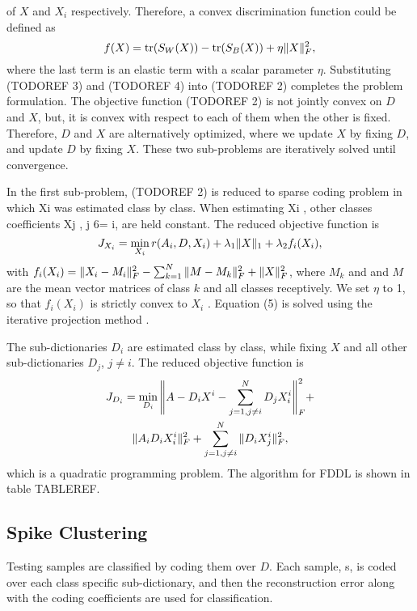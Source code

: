 \documentclass[conference]{IEEEtran}
\begin{document}
	of $X$ and $X_i$ respectively. Therefore, a convex discrimination
	function could be defined as
	\begin{equation}
		f(X)=\mathrm{tr}(S_W(X))-\mathrm{tr}(S_B(X))+\eta\Vert{X}\Vert_F^2,
	\end{equation}
	where the last term is an elastic term with a scalar parameter $\eta$. Substituting (TODOREF 3) and (TODOREF 4) into (TODOREF 2) completes the problem formulation. The objective function (TODOREF 2) is not jointly convex on $D$ and $X$, but, it is convex with respect to each of them when the other is fixed. Therefore, $D$ and $X$ are alternatively optimized, where we update $X$ by fixing $D$, and update $D$ by fixing $X$. These two sub-problems are iteratively solved until convergence.
	
	In the first sub-problem, (TODOREF 2) is reduced to sparse coding problem in which Xi was estimated class by class. When estimating Xi , other classes coefficients Xj , j 6= i, are held constant. The reduced objective function is
	\begin{equation}
		J_{X_i}=\min_{X_i}r(A_i,D,X_i)+\lambda_1\Vert{X}\Vert_1+\lambda_2f_i(X_i),
	\end{equation}
	with $f_i(X_i)=\Vert{X_i-M_i}\Vert_F^2-\sum_{k=1}^{N}\Vert{M-M_k}\Vert_F^2+\Vert{X}\Vert_F^2$, where $M_k$ and and $M$ are the mean vector matrices of class $k$ and all classes receptively. We set $\eta$ to 1, so that $f_i(X_i)$ is strictly convex to $X_i$ . Equation (5) is solved using the iterative projection method \cite{yang2011fisher}.
	
	The sub-dictionaries $D_i$ are estimated class by class, while fixing $X$ and all other sub-dictionaries $D_j$, $j\neq i$. The reduced objective function is
	\begin{multline}
		J_{D_i}=\min_{D_i}\Bigg\Vert{A-D_iX^i-\sum_{j=1,j\neq i}^{N}D_jX_i^i}\Bigg\Vert_F^2 + \\
		\Vert{A_iD_iX_i^i}\Vert_F^2+\sum_{j=1,j\neq i}^{N}\Vert{D_iX_j^i}\Vert_F^2,
	\end{multline}
	which is a quadratic programming problem. The algorithm for FDDL is shown in table TABLEREF.
	
	\subsection{Spike Clustering}
	Testing samples are classified by coding them over $D$. Each sample, s, is coded over each class specific sub-dictionary, and then the reconstruction error along with the coding coefficients are used for classification.
	
\end{document}
